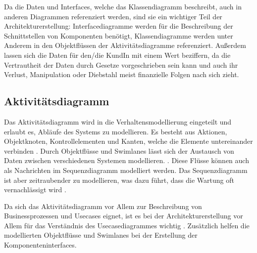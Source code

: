 Da die Daten und Interfaces, welche das Klassendiagramm beschreibt, auch in anderen Diagrammen referenziert werden, sind sie ein wichtiger Teil der Architekturerstellung: Interfacediagramme werden für die Beschreibung der Schnittstellen von Komponenten benötigt, Klassendiagramme werden unter Anderem in den Objektflüssen der Aktivitätsdiagramme referenziert. Außerdem lassen sich die Daten für den/die KundIn mit einem Wert beziffern, da die Vertrautheit der Daten durch Gesetze vorgeschrieben sein kann und auch ihr Verlust, Manipulation oder Diebstahl meist finanzielle Folgen nach sich zieht.


\subsection{Aktivitätsdiagramm}
Das Aktivitätsdiagramm wird in die Verhaltensmodellierung eingeteilt und erlaubt es, Abläufe des Systems zu modellieren. Es besteht aus Aktionen, Objektknoten, Kontrollelementen und Kanten, welche die Elemente untereinander verbinden \cite[S. 264]{glasklar}. Durch Objektflüsse und Swimlanes lässt sich der Austausch von Daten zwischen verschiedenen Systemen modellieren. \cite[S. 268]{glasklar}. Diese Flüsse können auch als Nachrichten im Sequenzdiagramm modelliert werden. Das Sequenzdiagramm ist aber zeitraubender zu modellieren, was dazu führt, dass die Wartung oft vernachlässigt wird \cite[S. 414]{glasklar}. \cite[S. 263-274]{glasklar}


Da sich das Aktivitätsdiagramm vor Allem zur Beschreibung von Businessprozessen und Usecases eignet, ist es bei der Architekturerstellung vor Allem für das Verständnis des Usecasediagrammes wichtig \cite[S. 271-272]{glasklar}. Zusätzlich helfen die modellierten Objektflüsse und Swimlanes bei der Erstellung der Komponenteninterfaces.